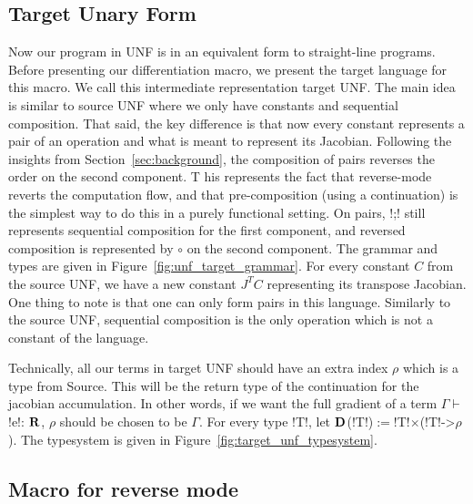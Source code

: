 

\subsection{Target Unary Form}

Now our program in UNF is in an equivalent form to straight-line programs. 
Before presenting our differentiation macro, we present the target language for this macro. 
We call this intermediate representation target UNF.
The main idea is similar to source UNF where we only have constants and sequential composition.
That said, the key difference is that now every constant represents a pair of an operation and what is meant to represent its Jacobian.
Following the insights from Section~\ref{sec:background}, the composition of pairs reverses the order on the second component. T
his represents the fact that reverse-mode reverts the computation flow, 
and that pre-composition (using a continuation) is the simplest way to do this in a purely functional setting.
On pairs, !;! still represents sequential composition for the first component, and reversed composition is represented by $\circ$ on the second component.
The grammar and types are given in Figure~\ref{fig:unf_target_grammar}. 
For every constant $C$ from the source UNF, we have a new constant $J^TC$ representing its transpose Jacobian.
One thing to note is that one can only form pairs in this language. 
Similarly to the source UNF, sequential composition is the only operation which is not a constant of the language.



Technically, all our terms in target UNF should have an extra index $\rho$ which is a type from Source.
This will be the return type of the continuation for the jacobian accumulation. 
In other words, if we want the full gradient of a term $\Gamma\vdash$!e!: $\mathbf{R}$, $\rho$ should be chosen to be $\Gamma$.
For every type !T!, let $\mathbf{D}$(!T!)$:=$!T!$\times$(!T!->$\rho$). 
The typesystem is given in Figure~\ref{fig:target_unf_typesystem}. 




\subsection{Macro for reverse mode}

